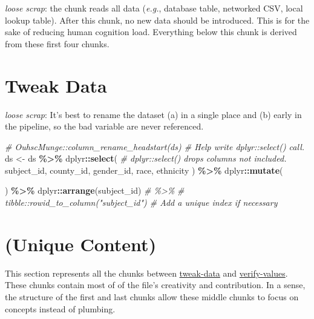 \documentclass[
]{book}
\newenvironment{Shaded}{\begin{snugshade}}{\end{snugshade}}
\newcommand{\CommentTok}[1]{\textcolor[rgb]{0.56,0.35,0.01}{\textit{#1}}}
\newcommand{\KeywordTok}[1]{\textcolor[rgb]{0.13,0.29,0.53}{\textbf{#1}}}
\newcommand{\NormalTok}[1]{#1}
\newcommand{\OperatorTok}[1]{\textcolor[rgb]{0.81,0.36,0.00}{\textbf{#1}}}
\newcommand{\StringTok}[1]{\textcolor[rgb]{0.31,0.60,0.02}{#1}}
\begin{document}
\emph{loose scrap}:
the chunk reads all data (\emph{e.g.}, database table, networked CSV, local lookup table). After this chunk, no new data should be introduced. This is for the sake of reducing human cognition load. Everything below this chunk is derived from these first four chunks.

\hypertarget{chunk-tweak-data}{%
\section{Tweak Data}\label{chunk-tweak-data}}

\emph{loose scrap}:
It's best to rename the dataset (a) in a single place and (b) early in the pipeline, so the bad variable are never referenced.

\begin{Shaded}
\begin{Highlighting}[]
\CommentTok{\# OuhscMunge::column\_rename\_headstart(ds) \# Help write \textasciigrave{}dplyr::select()\textasciigrave{} call.}
\NormalTok{ds <{-}}
\StringTok{  }\NormalTok{ds }\OperatorTok{\%>\%}
\StringTok{  }\NormalTok{dplyr}\OperatorTok{::}\KeywordTok{select}\NormalTok{(    }\CommentTok{\# \textasciigrave{}dplyr::select()\textasciigrave{} drops columns not included.}
\NormalTok{    subject\_id,}
\NormalTok{    county\_id,}
\NormalTok{    gender\_id,}
\NormalTok{    race,}
\NormalTok{    ethnicity}
\NormalTok{  ) }\OperatorTok{\%>\%}
\StringTok{  }\NormalTok{dplyr}\OperatorTok{::}\KeywordTok{mutate}\NormalTok{(}

\NormalTok{  ) }\OperatorTok{\%>\%}
\StringTok{  }\NormalTok{dplyr}\OperatorTok{::}\KeywordTok{arrange}\NormalTok{(subject\_id) }\CommentTok{\# \%>\%}
  \CommentTok{\# tibble::rowid\_to\_column("subject\_id") \# Add a unique index if necessary}
\end{Highlighting}
\end{Shaded}

\hypertarget{chunk-unique}{%
\section{(Unique Content)}\label{chunk-unique}}

This section represents all the chunks between \protect\hyperlink{chunk-tweak-data}{tweak-data} and \protect\hyperlink{chunk-verify-values}{verify-values}. These chunks contain most of of the file's creativity and contribution. In a sense, the structure of the first and last chunks allow these middle chunks to focus on concepts instead of plumbing.
\end{document}
